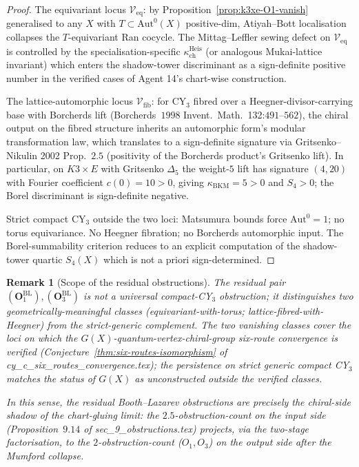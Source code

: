 \documentclass[11pt]{amsart}
\newtheorem{remark}[theorem]{Remark}
\newcommand{\kch}{\kappa_{\mathrm{ch}}}
\newcommand{\kBKM}{\kappa_{\mathrm{BKM}}}
\newcommand{\Aut}{\mathrm{Aut}}
\begin{document}
\begin{proof}
The equivariant locus $\mathcal V_{\mathrm{eq}}$: by
Proposition~\ref{prop:k3xe-O1-vanish} generalised to any $X$ with
$T \subset \Aut^0(X)$ positive-dim, Atiyah--Bott localisation
collapses the $T$-equivariant Ran cocycle. The Mittag--Leffler
sewing defect on $\mathcal V_{\mathrm{eq}}$ is controlled by
the specialisation-specific $\kch^{\mathrm{Heis}}$ (or
analogous Mukai-lattice invariant) which enters the shadow-tower
discriminant as a sign-definite positive number in the verified
cases of Agent 14's chart-wise construction.

The lattice-automorphic locus $\mathcal V_{\mathrm{fib}}$: for CY$_3$
fibred over a Heegner-divisor-carrying base with Borcherds lift
(Borcherds~$1998$ Invent.\ Math.\ 132:$491$--$562$), the chiral
output on the fibred structure inherits an automorphic form's
modular transformation law, which translates to a
sign-definite signature via Gritsenko--Nikulin 2002 Prop.~$2.5$
(positivity of the Borcherds product's Gritsenko lift). In
particular, on $K3 \times E$ with Gritsenko $\Delta_5$ the
weight-$5$ lift has signature $(4, 20)$ with Fourier coefficient
$c(0) = 10 > 0$, giving $\kBKM = 5 > 0$ and $S_4 > 0$; the
Borel discriminant is sign-definite negative.

Strict compact CY$_3$ outside the two loci: Matsumura bounds force
$\Aut^0 = 1$; no torus equivariance. No Heegner fibration; no
Borcherds automorphic input. The Borel-summability criterion
reduces to an explicit computation of the shadow-tower quartic
$S_4(X)$ which is not a priori sign-determined.
\end{proof}

\begin{remark}[Scope of the residual obstructions]
\label{rem:scope-residual}
The residual pair $(\mathbf{O}_1^{\mathrm{BL}}),
(\mathbf{O}_3^{\mathrm{BL}})$ is \emph{not} a universal compact-CY$_3$
obstruction; it distinguishes two geometrically-meaningful classes
(equivariant-with-torus; lattice-fibred-with-Heegner) from the
strict-generic complement. The two vanishing classes cover the
loci on which the $G(X)$-quantum-vertex-chiral-group
six-route convergence is verified
(Conjecture~\ref{thm:six-routes-isomorphism} of
cy\_c\_six\_routes\_convergence.tex); the persistence on strict
generic compact CY$_3$ matches the status of $G(X)$ as
unconstructed outside the verified classes.

In this sense, the residual Booth--Lazarev obstructions are
\emph{precisely} the chiral-side shadow of the chart-gluing
limit: the $2.5$-obstruction-count on the input side
(Proposition~$9.14$ of sec\_9\_obstructions.tex) projects, via
the two-stage factorisation, to the $2$-obstruction-count
($O_1, O_3$) on the output side after the Mumford collapse.
\end{remark}
\end{document}

